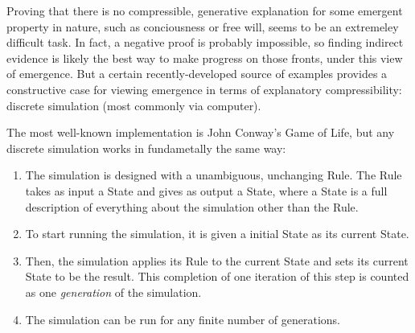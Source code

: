 \documentclass{article}
\newcommand{\ti}[1]{\textit{#1}}
\begin{document}
Proving that there is no compressible, generative explanation for some emergent property in nature, such as conciousness or free will, seems to be an extremeley difficult task. In fact, a negative proof is probably impossible, so finding indirect evidence is likely the best way to make progress on those fronts, under this view of emergence. But a certain recently-developed source of examples provides a constructive case for viewing emergence in terms of explanatory compressibility: discrete simulation (most commonly via computer).




The most well-known implementation is John Conway's Game of Life, but any discrete simulation works in fundametally the same way:

\begin{enumerate}
\item The simulation is designed with a unambiguous, unchanging Rule. The Rule takes as input a State and gives as output a State, where a State is a full description of everything about the simulation other than the Rule.
\item To start running the simulation, it is given a initial State as its current State.
\item Then, the simulation applies its Rule to the current State and sets its current State to be the result. This completion of one iteration of this step is counted as one \ti{generation} of the simulation.
\item The simulation can be run for any finite number of generations.
\end{enumerate}
\end{document}
